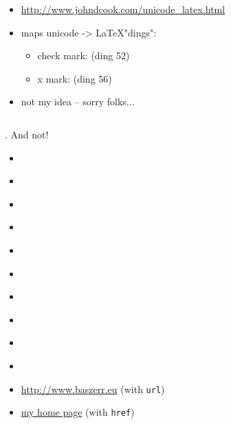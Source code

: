 {
\begin{itemize}
\item \url{http://www.johndcook.com/unicode\_latex.html}
\item maps unicode -> \LaTeX "dings":
\begin{itemize}
\item check mark:  (ding 52)
\item x mark:  (ding 56)
\end{itemize}
\item not my idea -- sorry folks...
\end{itemize}

\begin{columns}

\begin{column}{0.45\textwidth}
\begin{center}
\color{red}
\fontsize{60}{70}\selectfont
{}
\end{center}
\end{column}

\begin{column}{0.45\textwidth}
\begin{center}
\color{green}
\fontsize{60}{70}\selectfont
{}
\end{center}
\end{column}

\end{columns}
}


{
{  }
{  }
{  }
{  }
{ . }
And not!

\vspace{1em}
\begin{itemize}
  \item {  }
  \item {  }
  \item {  }
  \item {  }
  \item {  }
  \item {  }
  \item {  }
  \item {  }
  \item {  }
  \item {  }
\end{itemize}
}


{
\begin{itemize}
\item \url{http://www.baszerr.eu} (with \texttt{url})
\item \href{http://www.baszerr.eu}{my home page} (with \texttt{href})
\end{itemize}
}
